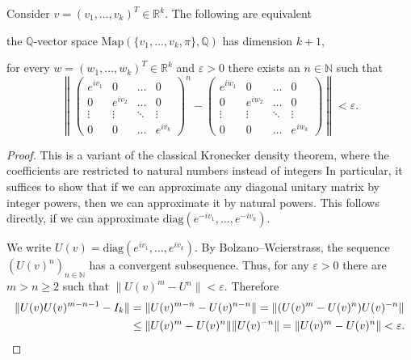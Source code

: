 \documentclass[a4paper, oneside, 12pt]{amsart}
\begin{document}
\begin{lemma}\label{lem:kronecker-density-theorem}
  Consider \(v=(v_{1}, \dots , v_{k})^{T} \in \mathbb{R}^{k}\).
  The following are equivalent
  \begin{thmlist}
    \item the \( \mathbb{Q}\)-vector space \(\mathrm{Map}(\{v_{1}, \dots , v_{k}, \pi\}, \mathbb{Q})\) has dimension \(k+1\),
    \item for every \(w= (w_{1}, \dots , w_{k})^{T} \in \mathbb{R}^{k}\) and \(\varepsilon> 0\) there exists an \(n \in \mathbb{N}\) such that
    \begin{equation*}
      \left\|
        \begin{pmatrix}
          e^{i  v_1} & 0 & \dots & 0 \\
          0 & e^{i  v_2} & \dots & 0 \\
          \vdots & \vdots & \ddots & \vdots \\
          0 & 0 & \dots & e^{i  v_k}
        \end{pmatrix}^{n} -
        \begin{pmatrix}
          e^{i w_1} & 0 & \dots & 0 \\
          0 & e^{i w_2} & \dots & 0 \\
          \vdots & \vdots & \ddots & \vdots \\
          0 & 0 & \dots & e^{i w_k}
        \end{pmatrix} \right\| < \varepsilon.
    \end{equation*}
  \end{thmlist}
\end{lemma}
\begin{proof}
  This is a variant of the classical Kronecker density theorem, where the coefficients are restricted to natural numbers instead of integers
  In particular, it suffices to show that if we can approximate any diagonal unitary matrix by integer powers, then we can approximate it by natural powers.
  This follows directly, if we can approximate \(\mathrm{diag}(e^{-i v_1}, \dots, e^{-i v_k})\).

  We write \(U(v) = \mathrm{diag}(e^{i v_1}, \dots, e^{i v_k})\).
  By Bolzano--Weierstrass, the sequence \((U(v)^{n})_{n\in \mathbb{N}}\) has a convergent subsequence.
  Thus, for any \(\varepsilon> 0 \) there are \( m > n \geq 2\) such that \(\|U(v)^{m} - U^{n}\| <\varepsilon\).
  Therefore
  \begin{align*}
    \|U(v) U(v)^{m-n-1} - I_{k}\|
    & = \|U(v)^{m-n} - U(v)^{n-n}\|
      = \|(U(v)^{m} - U(v)^{n})U(v)^{-n}\| \\
    & \leq \| U(v)^{m} - U(v)^{n}\|\|U(v)^{-n}\|
      = \| U(v)^{m} - U(v)^{n}\| < \varepsilon. \qedhere
  \end{align*}
\end{proof}
\end{document}
